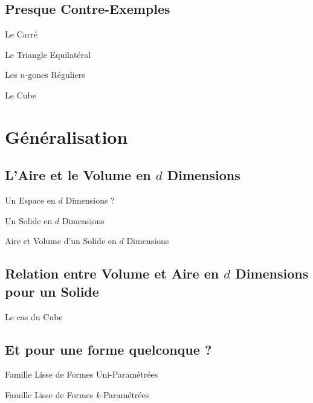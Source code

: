 \documentclass{beamercours}
\begin{document}
        \subsection{Presque Contre-Exemples}
            \begin{frame}{Le Carré}
                
            \end{frame}

            \begin{frame}{Le Triangle Equilatéral}
                
            \end{frame}

            \begin{frame}{Les $n$-gones Réguliers}
                
            \end{frame}

            \begin{frame}{Le Cube}
                
            \end{frame}

    \section{Généralisation}
        \subsection{L'Aire et le Volume en $d$ Dimensions}
            \begin{frame}{Un Espace en $d$ Dimensions ?}
                
            \end{frame}

            \begin{frame}{Un Solide en $d$ Dimensions}
                
            \end{frame}

            \begin{frame}{Aire et Volume d'un Solide en $d$ Dimensions}
                
            \end{frame}

        \subsection{Relation entre Volume et Aire en $d$ Dimensions pour un Solide}
            \begin{frame}{Le cas du Cube}
                
            \end{frame}


        \subsection{Et pour une forme quelconque ?}
            \begin{frame}{Famille Lisse de Formes Uni-Paramétrées}
                
            \end{frame}

            \begin{frame}{Famille Lisse de Formes $k$-Paramétrées}
                
            \end{frame}
\end{document}
